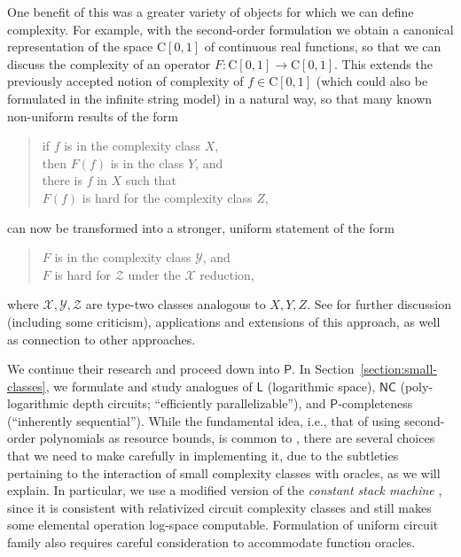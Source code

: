 \documentclass[conference]{IEEEtran}
\newcommand{\classonefont}[1]{\mathsf{#1}}
\newcommand{\classL}{\classonefont{L}}
\newcommand{\classP}{\classonefont{P}}
\newcommand{\classNC}{\classonefont{NC}}
\newcommand{\classC}{\mathrm C}
\theoremstyle{definition}
\theoremstyle{remark}
\begin{document}
One benefit of this was
a greater variety of objects for which we can define complexity. 
For example, with the second-order formulation
we obtain a canonical representation of the space $\classC [0, 1]$
of continuous real functions, 
so that we can discuss the complexity of an
operator $F \colon \classC [0, 1] \to \classC [0, 1]$. 
This extends the previously accepted notion of 
complexity of $f \in \classC [0, 1]$
(which could also be formulated in the infinite string model)
in a natural way, so that many known non-uniform results of the form
\begin{quote}
 if $f$ is in the complexity class $X$, \\
 \mbox{}\qquad then $F(f)$ is in the class $Y$, and \\
 there is $f$ in $X$ such that \\ 
 \mbox{}\qquad $F(f)$ is hard for the complexity class $Z$, 
\end{quote}
can now be transformed into a stronger, uniform statement of the form
\begin{quote}
 $F$ is in the complexity class $\mathcal Y$, and \\
 $F$ is hard for $\mathcal Z$ under the $\mathcal X$ reduction,
\end{quote}
where $\mathcal{X, Y, Z}$ are type-two classes analogous to ${X, Y, Z}$.
See \cite{ambos-spies,feree,rettinger,roesnick,ziegler} for further discussion 
(including some criticism), 
applications and extensions of this approach, 
as well as connection to other approaches. 

We continue their research and proceed down into $\classP$. 
In Section~\ref{section:small-classes}, 
we formulate and study analogues of 
$\classL$ (logarithmic space), 
$\classNC$ (poly-logarithmic depth circuits; ``efficiently parallelizable''), 
and 
$\classP$-completeness (``inherently sequential''). 
While the fundamental idea, 
i.e., that of using second-order polynomials as resource bounds, 
is common to \cite{kawamura2012complexity}, 
there are several choices that we need to make carefully
in implementing it, 
due to the subtleties pertaining to 
the interaction of small complexity classes with oracles, 
as we will explain. 
In particular, 
we use a modified version of 
the \emph{constant stack machine} \cite{aehlig2007relativizing}, 
since it is consistent with relativized circuit complexity classes 
and still makes some elemental operation log-space computable.
Formulation of uniform circuit family
also requires careful consideration to 
accommodate function oracles. 
\end{document}

